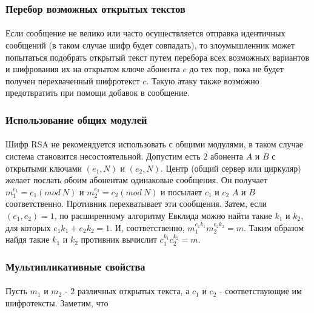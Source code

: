 \subsubsection{Перебор возможных открытых текстов}

  \paragraph{} Если сообщение не велико или часто осуществляется отправка идентичных сообщений (в таком случае шифр будет совпадать), то злоумышленник может попытаться подобрать открытый текст путем перебора всех возможных вариантов и шифрования их на открытом ключе абонента $e$ до тех пор, пока не будет получен перехваченный 
  шифротекст $c$. Такую атаку также возможно предотвратить при помощи добавок в сообщение.

\subsubsection{Использование общих модулей}

  \paragraph{} Шифр RSA не рекомендуется использовать с общими модулями, в таком случае система  становится несостоятельной. Допустим есть 2 абонента $A$ и $B$ с 
  открытыми ключами $(e_{1}, N)$ и $(e_{2}, N)$. Центр (общий сервер или циркуляр) желает послать обоим абонентам одинаковые сообщения. 
  Он получает $m_1^{e_1} = c_1(mod \: N)$ и $m_2^{e_2} = c_2(mod \: N)$ и посылает $c_1$ и 
  $c_2$ $A$ и $B$ соответственно. Противник перехватывает эти сообщения. Затем, если $(e_1, e_2) = 1$, по 
  расширенному алгоритму Евклида можно найти такие $k_1$ и $k_2$, для которых $e_1 k_1 + e_2 k_2 = 1$. И, соответственно, 
  $m_1^{e_1 k_1} m_2^{e_2 k_2} = m$. Таким образом найдя такие $k_1$ и $k_2$ противник вычислит $c_1^{k_1} c_2^{k_2} = m$.

\subsubsection{Мультипликативные свойства}

  \paragraph{} Пусть $m_1$ и $m_2$ - 2 различных открытых текста, а $c_1$
  и $c_2$ - соответствующие им шифротексты. Заметим, что
  
